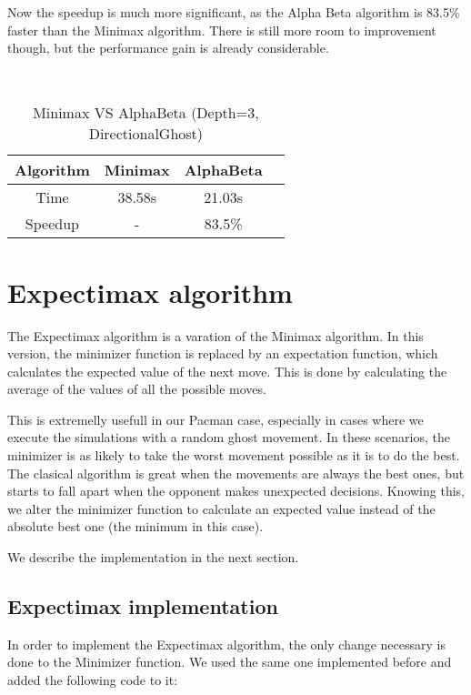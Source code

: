 \documentclass{article}
\begin{document}
Now the speedup is much more significant, as the Alpha Beta algorithm is 83.5\% faster than the Minimax algorithm. There is still more room to improvement though, but the performance gain is already considerable.

~\\
\begin{table}[!ht]
  \begin{center}
    \begin{tabular}{||c||c|c|c||}
      \hline
      Algorithm & Minimax & AlphaBeta \\
      \hline\hline
      Time & 38.58s & 21.03s \\
      \hline\hline
      Speedup & - & 83.5\% \\
      \hline
    \end{tabular}
    \caption{Minimax VS AlphaBeta (Depth=3, DirectionalGhost)}
    \label{tab:minimax_vs_alphabeta2}
  \end{center}
\end{table}

\pagebreak
\section{Expectimax algorithm}

The Expectimax algorithm is a varation of the Minimax algorithm. In this version, the minimizer function is replaced by an expectation function, which calculates the expected value of the next move. This is done by calculating the average of the values of all the possible moves.

This is extremelly usefull in our Pacman case, especially in cases where we execute the simulations with a random ghost movement. In these scenarios, the minimizer is as likely to take the worst movement possible as it is to do the best. The clasical algorithm is great when the movements are always the best ones, but starts to fall apart when the opponent makes unexpected decisions. Knowing this, we alter the minimizer function to calculate an expected value instead of the absolute best one (the minimum in this case).

We describe the implementation in the next section.

\subsection{Expectimax implementation}
\label{sec:expectimax}

In order to implement the Expectimax algorithm, the only change necessary is done to the Minimizer function. We used the same one implemented before and added the following code to it:
\end{document}
